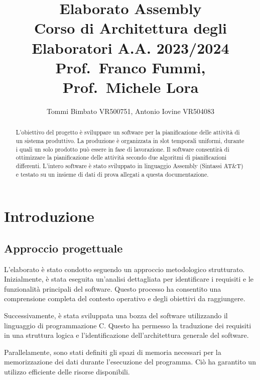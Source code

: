 \documentclass[a4paper]{report}
\author{Tommi Bimbato VR500751, Antonio Iovine VR504083}
\title{Elaborato Assembly \\ \normalsize Corso di Architettura degli Elaboratori A.A. 2023/2024 \\ Prof.\ Franco Fummi, Prof.\ Michele Lora}
\begin{document}
\begin{titlepage}
    \maketitle
\end{titlepage}

\thispagestyle{empty} %

\tableofcontents %

\begin{abstract}

  L'obiettivo del progetto è sviluppare un software per la pianificazione delle attività di un sistema produttivo.
  La produzione è organizzata in slot temporali uniformi, durante i quali un solo prodotto può essere in fase di lavorazione. 
  Il software consentirà di ottimizzare la pianificazione delle attività secondo due algoritmi di pianificazioni differenti.
  L'intero software è stato sviluppato in linguaggio Assembly (Sintassi AT&T) e testato su un insieme di dati di prova allegati a questa documentazione.

\end{abstract}

\chapter{Introduzione}
\section{Approccio progettuale}
L'elaborato è stato condotto seguendo un approccio metodologico strutturato.
Inizialmente, è stata eseguita un'analisi dettagliata per identificare i requisiti
e le funzionalità principali del software. Questo processo ha consentito
una comprensione completa del contesto operativo e degli obiettivi da raggiungere.

Successivamente, è stata sviluppata una bozza del software utilizzando il linguaggio
di programmazione C. Questo ha permesso la traduzione dei requisiti in
una struttura logica e l'identificazione dell'architettura generale del software.

Parallelamente, sono stati definiti gli spazi di memoria necessari
per la memorizzazione dei dati durante l'esecuzione del programma.
Ciò ha garantito un utilizzo efficiente delle risorse disponibili.
\end{document}
